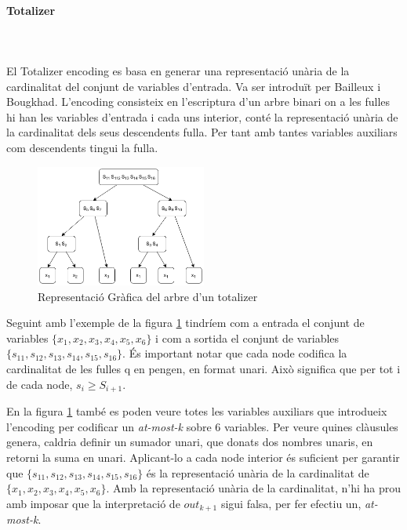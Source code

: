 \documentclass[11pt,a4paper,twoside]{report}
\begin{document}
  \paragraph*{Totalizer} ~\\~\\
  El Totalizer encoding es basa en generar una representació unària de la cardinalitat del conjunt de variables d'entrada. 
  Va ser introduït per Bailleux i Bougkhad\cite{Bailleux2003EfficientCE}. L'encoding consisteix en l'escriptura d'un arbre binari on a les fulles hi han les variables d'entrada i cada uns interior, 
  conté la representació unària de la cardinalitat dels seus descendents fulla. Per tant amb tantes variables auxiliars com descendents tingui la fulla.

  \begin{figure}[ht!]
    \centering
    \includegraphics[width=0.5\textwidth]{Diagrames/totalizer.png}
    \caption{Representació Gràfica del arbre d'un totalizer}
    \label{fig:totalizer}
  \end{figure}

  Seguint amb l'exemple de la figura \ref{fig:totalizer} tindríem com a entrada el conjunt de variables $\{x_1, x_2, x_3, x_4, x_5, x_6\}$ i com a sortida el conjunt de variables $\{s_{11}, s_{12}, s_{13}, s_{14}, s_{15}, s_{16}\}$. És important notar que cada node codifica la cardinalitat de les fulles q en pengen, en format unari. Això significa que per tot i de cada node, $s_i \geq S_{i+1}$.

  En la figura \ref{fig:totalizer} també es poden veure totes les variables auxiliars que introdueix l'encoding per codificar un \textit{at-most-k} sobre 6 variables. Per veure quines clàusules genera, caldria definir un sumador unari, que donats dos nombres unaris, en retorni la suma en unari. 
  Aplicant-lo a cada node interior és suficient per garantir que $\{s_{11}, s_{12}, s_{13}, s_{14}, s_{15}, s_{16}\}$ és la representació unària de la cardinalitat de $\{x_1, x_2, x_3, x_4, x_5, x_6\}$. 
  Amb la representació unària de la cardinalitat, n'hi ha prou amb imposar que la interpretació de $out_{k+1}$ sigui falsa, per fer efectiu un, \textit{at-most-k}. 
 
\end{document}
